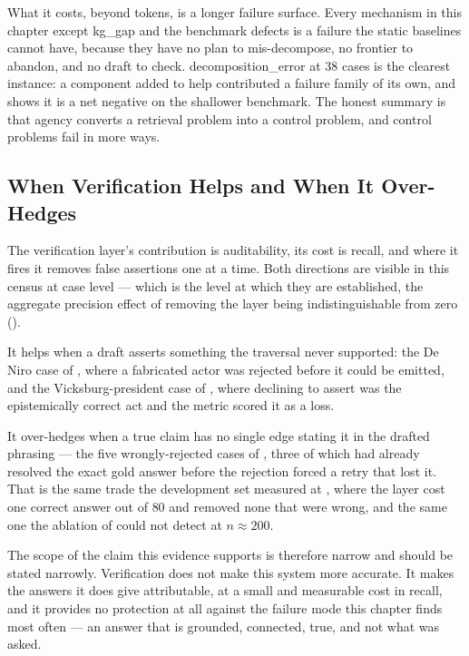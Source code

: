 What it costs, beyond tokens, is a longer failure surface. Every mechanism in
this chapter except \textsf{kg\_gap} and the benchmark defects is a failure the
static baselines cannot have, because they have no plan to mis-decompose, no
frontier to abandon, and no draft to check. \textsf{decomposition\_error} at
$38$ cases is the clearest instance: a component added to help contributed a
failure family of its own, and  shows it is a net negative
on the shallower benchmark. The honest summary is that agency converts a
retrieval problem into a control problem, and control problems fail in more
ways.

\subsection{When Verification Helps and When It
Over-Hedges}\label{sec:verification-tradeoff}

The verification layer's contribution is auditability, its cost is recall, and
where it fires it removes false assertions one at a time. Both directions are
visible in this census at case level --- which is the level at which they are
established, the aggregate precision effect of removing the layer being
indistinguishable from zero ().

It helps when a draft asserts something the traversal never supported: the De
Niro case of , where a fabricated actor was rejected
before it could be emitted, and the Vicksburg-president case of
, where declining to assert was the epistemically
correct act and the metric scored it as a loss.

It over-hedges when a true claim has no single edge stating it in the drafted
phrasing --- the five wrongly-rejected cases of ,
three of which had already resolved the exact gold answer before the rejection
forced a retry that lost it. That is the same trade the development set measured
at , where the layer cost one correct answer out of $80$
and removed none that were wrong, and the same one the ablation of
 could not detect at $n \approx 200$.

The scope of the claim this evidence supports is therefore narrow and should be
stated narrowly. Verification does not make this system more accurate. It makes
the answers it does give attributable, at a small and measurable cost in recall,
and it provides no protection at all against the failure mode this chapter finds
most often --- an answer that is grounded, connected, true, and not what was
asked.

